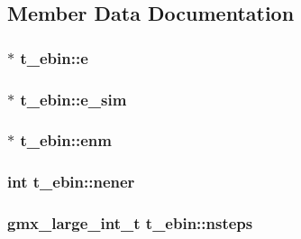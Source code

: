 \subsection{\-Member \-Data \-Documentation}
\hypertarget{structt__ebin_a6ad706f7a36342286bd8009e005e94d3}{
\subsubsection[{e}]{ $\ast$ {\bf t\-\_\-ebin\-::e}}}\label{structt__ebin_a6ad706f7a36342286bd8009e005e94d3}
\hypertarget{structt__ebin_adc24591c3ca9e82eb0666cc43f07351d}{
\subsubsection[{e\-\_\-sim}]{ $\ast$ {\bf t\-\_\-ebin\-::e\-\_\-sim}}}\label{structt__ebin_adc24591c3ca9e82eb0666cc43f07351d}
\hypertarget{structt__ebin_a0f3a8bbf9b73af6e1b210b80bf76c4fb}{
\subsubsection[{enm}]{ $\ast$ {\bf t\-\_\-ebin\-::enm}}}\label{structt__ebin_a0f3a8bbf9b73af6e1b210b80bf76c4fb}
\hypertarget{structt__ebin_abb690ba38825fcadb2b1aa38b75b75c8}{
\subsubsection[{nener}]{\setlength{\rightskip}{0pt plus 5cm}int {\bf t\-\_\-ebin\-::nener}}}\label{structt__ebin_abb690ba38825fcadb2b1aa38b75b75c8}
\hypertarget{structt__ebin_acc8d230d4621e597634dc437e079be75}{
\subsubsection[{nsteps}]{\setlength{\rightskip}{0pt plus 5cm}gmx\-\_\-large\-\_\-int\-\_\-t {\bf t\-\_\-ebin\-::nsteps}}}\label{structt__ebin_acc8d230d4621e597634dc437e079be75}
